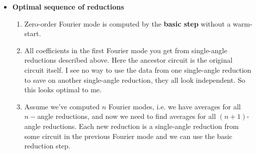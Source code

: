 \documentclass[12 pt]{article}
\begin{document}
\begin{itemize}
\begin{itemize}
	\end{itemize}
\item \textbf{Optimal sequence of reductions}
\begin{enumerate}
	\item  Zero-order Fourier mode is computed by the  \textbf{basic step} without a warm-start.
	\item All coefficients in the first Fourier mode you get from single-angle reductions described above. Here the ancestor circuit is the original circuit itself. I see no way to use the data from one single-angle reduction to save on another single-angle reduction, they all look independent. So this looks optimal to me.
	\item Assume we've computed $n$ Fourier modes, i.e. we have averages for all $n-$angle reductions, and now we need to find averages for all $(n+1)$-angle reductions. Each new reduction is a single-angle reduction from some circuit in the previous Fourier mode and we can use the basic reduction step.
\end{enumerate}

\end{itemize}
\end{document}
